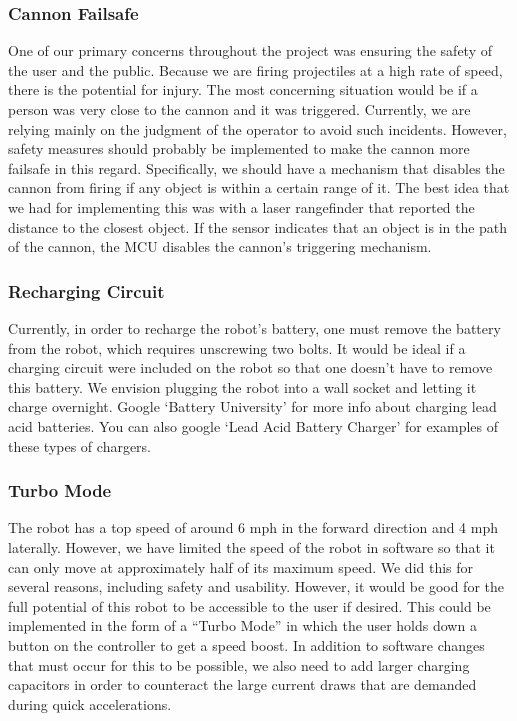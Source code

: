 \documentclass[letterpaper,12pt]{article}
\begin{document}
\subsubsection{Cannon Failsafe}
One of our primary concerns throughout the project was ensuring the safety of
the user and the public. Because we are firing projectiles at a high rate of
speed, there is the potential for injury. The most concerning situation would be
if a person was very close to the cannon and it was triggered. Currently, we are
relying mainly on the judgment of the operator to avoid such incidents. However,
safety measures should probably be implemented to make the cannon more failsafe
in this regard. Specifically, we should have a mechanism that disables the
cannon from firing if any object is within a certain range of it. The best idea
that we had for implementing this was with a laser rangefinder that reported the
distance to the closest object. If the sensor indicates that an object is in the
path of the cannon, the MCU disables the cannon's triggering mechanism.

\subsubsection{Recharging Circuit}
Currently, in order to recharge the robot's battery, one must remove the
battery from the robot, which requires unscrewing two bolts. It would be ideal
if a charging circuit were included on the robot so that one doesn't have to
remove this battery. We envision plugging the robot into a wall socket and
letting it charge overnight. Google `Battery University' for more info about
charging lead acid batteries. You can also google `Lead Acid Battery Charger'
for examples of these types of chargers.

\subsubsection{Turbo Mode}
The robot has a top speed of around 6 mph in the forward direction and 4 mph
laterally. However, we have limited the speed of the robot in software so that
it can only move at approximately half of its maximum speed. We did this for
several reasons, including safety and usability. However, it would be good for
the full potential of this robot to be accessible to the user if desired. This
could be implemented in the form of a ``Turbo Mode'' in which the user holds
down a button on the controller to get a speed boost. In addition to software
changes that must occur for this to be possible, we also need to add larger
charging capacitors in order to counteract the large current draws that are
demanded during quick accelerations.
\end{document}

